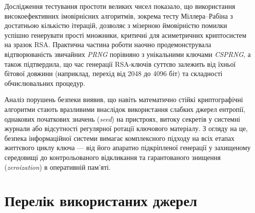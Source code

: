 \documentclass[12pt,a4paper]{article}
\begin{document}
Дослідження тестування простоти великих чисел показало, що використання високоефективних імовірнісних
алгоритмів, зокрема тесту Міллера--Рабіна з достатньою кількістю ітерацій, дозволяє з мізерною ймовірністю
помилки успішно генерувати прості множники, критичні для асиметричних криптосистем на зразок RSA.
Практична частина роботи наочно продемонструвала відтворюваність звичайних \textit{PRNG} порівняно з
унікальними ключами \textit{CSPRNG}, а також підтвердила, що час генерації RSA-ключів суттєво залежить від
їхньої бітової довжини (наприклад, перехід від 2048 до 4096 біт) та складності обчислювальних процедур. 

Аналіз порушень безпеки виявив, що навіть математично стійкі криптографічні алгоритми стають
вразливими внаслідок використання слабких джерел ентропії, однакових початкових значень (\textit{seed})
на пристроях, витоку секретів у системні журнали або відсутності регулярної ротації ключового матеріалу. З
огляду на це, безпека інформаційної системи вимагає комплексного підходу на всіх етапах життєвого циклу
ключа --- від його апаратно підкріпленої генерації у захищеному середовищі до контрольованого
відкликання та гарантованого знищення (\textit{zeroization}) в оперативній пам'яті.


\section*{Перелік використаних джерел}
\end{document}
